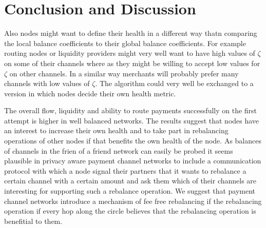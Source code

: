 \documentclass[a4paper]{paper}
\begin{document}
\section{Conclusion and Discussion}

Also nodes might want to define their health in a different way thatn comparing the local balance coefficients to their global balance coefficients.
For example routing nodes or liquidity providers might very well want to have high values of $\zeta$ on some of their channels where as they might be willing to accept low values for $\zeta$ on other channels.
In a similar way merchants will probably prefer many channels with low values of $\zeta$.
The algorithm could very well be exchanged to a version in which nodes decide their own health metric.


The overall flow, liquidity and ability to route payments successfully on the first attempt is higher in well balanced networks. 
The results suggest that nodes have an interest to increase their own health and to take part in rebalancing operations of other nodes if that benefits the own health of the node.
As balances of channels in the frien of a friend network can easily be probed it seems plausible in privacy aware payment channel networks to include a communication protocol with which a node signal their partners that it wants to rebalance a certain channel with a certain amount and ask them which of their channels are interesting for supporting such a rebalance operation.
We suggest that payment channel networks introduce a mechanism of fee free rebalancing if the rebalancing operation if every hop along the circle believes that the rebalancing operation is benefitial to them. 




\end{document}
